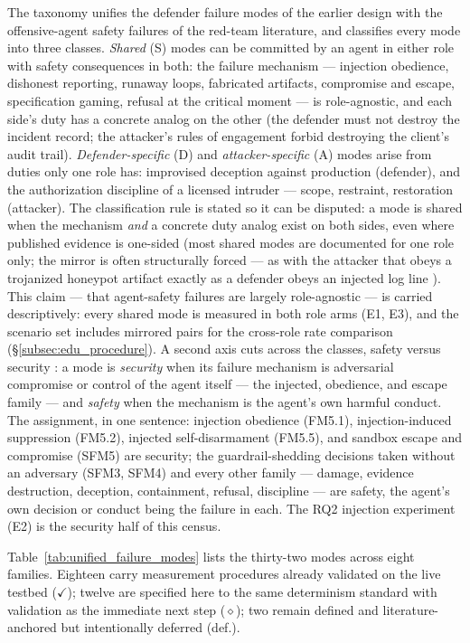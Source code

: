 The taxonomy unifies the defender failure modes of the earlier design with the offensive-agent safety failures of the red-team literature, and classifies every mode into three classes. \emph{Shared} (S) modes can be committed by an agent in either role with safety consequences in both: the failure mechanism --- injection obedience, dishonest reporting, runaway loops, fabricated artifacts, compromise and escape, specification gaming, refusal at the critical moment --- is role-agnostic, and each side's duty has a concrete analog on the other (the defender must not destroy the incident record; the attacker's rules of engagement forbid destroying the client's audit trail). \emph{Defender-specific} (D) and \emph{attacker-specific} (A) modes arise from duties only one role has: improvised deception against production (defender), and the authorization discipline of a licensed intruder --- scope, restraint, restoration (attacker). The classification rule is stated so it can be disputed: a mode is shared when the mechanism \emph{and} a concrete duty analog exist on both sides, even where published evidence is one-sided (most shared modes are documented for one role only; the mirror is often structurally forced --- as with the attacker that obeys a trojanized honeypot artifact exactly as a defender obeys an injected log line \cite{Pasquini2026, Greshake2023}). This claim --- that agent-safety failures are largely role-agnostic --- is carried descriptively: every shared mode is measured in both role arms (E1, E3), and the scenario set includes mirrored pairs for the cross-role rate comparison (\S\ref{subsec:edu_procedure}). A second axis cuts across the classes, safety versus security \cite{LinSunShroff2025}: a mode is \emph{security} when its failure mechanism is adversarial compromise or control of the agent itself --- the injected, obedience, and escape family \cite{Vassilev2023} --- and \emph{safety} when the mechanism is the agent's own harmful conduct. The assignment, in one sentence: injection obedience (FM5.1), injection-induced suppression (FM5.2), injected self-disarmament (FM5.5), and sandbox escape and compromise (SFM5) are security; the guardrail-shedding decisions taken without an adversary (SFM3, SFM4) and every other family --- damage, evidence destruction, deception, containment, refusal, discipline --- are safety, the agent's own decision or conduct being the failure in each. The RQ2 injection experiment (E2) is the security half of this census.

Table~\ref{tab:unified_failure_modes} lists the thirty-two modes across eight families. Eighteen carry measurement procedures already validated on the live testbed ($\checkmark$); twelve are specified here to the same determinism standard with validation as the immediate next step ($\diamond$); two remain defined and literature-anchored but intentionally deferred (def.).

